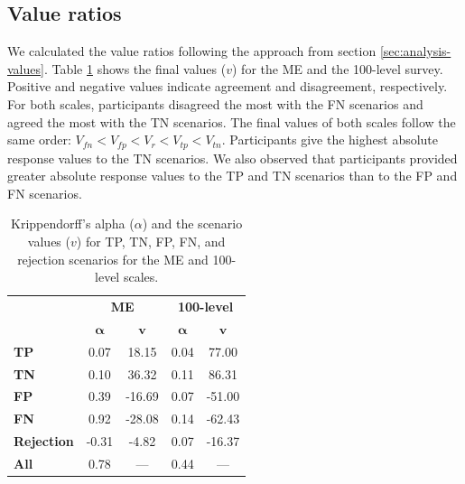 \subsection{Value ratios}
\label{sec:results-value-ratios}
We calculated the value ratios following the approach from section \ref{sec:analysis-values}.
%
Table \ref{tab:values-reliability} shows the final values ($v$) for the ME and the 100-level survey.
%
Positive and negative values indicate agreement and disagreement, respectively.
%
For both scales, participants disagreed the most with the FN scenarios and agreed the most with the TN scenarios.
%
The final values of both scales follow the same order: $V_{fn} < V_{fp} < V_{r} < V_{tp} < V_{tn}$.
%
Participants give the highest absolute response values to the TN scenarios.
%
We also observed that participants provided greater absolute response values to the TP and TN scenarios than to the FP and FN scenarios.
%
\begin{table}[h]
    \small
    \centering
    \begin{tabular}{lcccc}
        \toprule
                           & \multicolumn{2}{c}{\textbf{ME}} & \multicolumn{2}{c}{\textbf{100-level}}                                        \\
        \cmidrule(l){2-3} \cmidrule(l){4-5}
                           & $\boldsymbol{\alpha}$           & $\textbf{v}$                           & $\boldsymbol{\alpha}$ & $\textbf{v}$ \\
        \midrule
        \textbf{TP}        & 0.07                            & 18.15                                  & 0.04                  & 77.00        \\
        \textbf{TN}        & 0.10                            & 36.32                                  & 0.11                  & 86.31        \\
        \textbf{FP}        & 0.39                            & -16.69                                 & 0.07                  & -51.00       \\
        \textbf{FN}        & 0.92                            & -28.08                                 & 0.14                  & -62.43       \\
        \textbf{Rejection} & -0.31                           & -4.82                                  & 0.07                  & -16.37       \\
        \midrule
        \textbf{All}       & 0.78                            & ---                                    & 0.44                  & ---          \\
        \bottomrule
    \end{tabular}
    \caption{Krippendorff's alpha ($\alpha$) and the scenario values ($v$) for TP, TN, FP, FN, and rejection scenarios for the ME and 100-level scales.}
    \label{tab:values-reliability}
\end{table}

